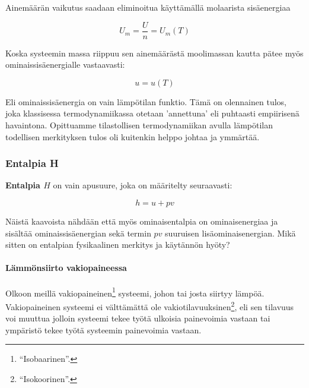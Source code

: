 \documentclass[12pt,a4paper,finnish]{book}
\begin{document}
Ainemäärän vaikutus saadaan eliminoitua käyttämällä molaarista sisäenergiaa

\begin{equation}
 U_m = \frac{U}{n} = U_m(T)
\end{equation}

Koska systeemin massa riippuu sen ainemäärästä moolimassan kautta pätee myös ominaissisäenergialle vastaavasti:

\begin{equation}
 u = u(T)
\end{equation}

Eli ominaissisäenergia on vain lämpötilan funktio. Tämä on olennainen tulos, joka klassisessa termodynamiikassa 
otetaan 'annettuna' eli puhtaasti empiirisenä havaintona. Opittuamme tilastollisen termodynamiikan avulla lämpötilan 
todellisen merkityksen tulos oli kuitenkin helppo johtaa ja ymmärtää.



\subsubsection{Entalpia H} \label{sssection:entalpia}

\textbf{Entalpia $H$} on vain apusuure, joka on määritelty seuraavasti:

\begin{equation}
 h = u + pv
\end{equation}

Näistä kaavoista nähdään että myös ominaisentalpia on ominaisenergiaa ja sisältää ominaissisäenergian sekä termin $pv$ 
suuruisen lisäominaisenergian. Mikä sitten on entalpian fysikaalinen merkitys ja käytännön hyöty?


\paragraph{Lämmönsiirto vakiopaineessa}

Olkoon meillä vakiopaineinen\footnote{``Isobaarinen''.} systeemi, johon tai josta siirtyy lämpöä. Vakiopaineinen systeemi 
ei välttämättä ole vakiotilavuuksinen\footnote{``Isokoorinen''.}, eli sen tilavuus voi muuttua jolloin systeemi tekee 
työtä ulkoisia painevoimia vastaan tai ympäristö tekee työtä systeemin painevoimia vastaan. 
\end{document}
